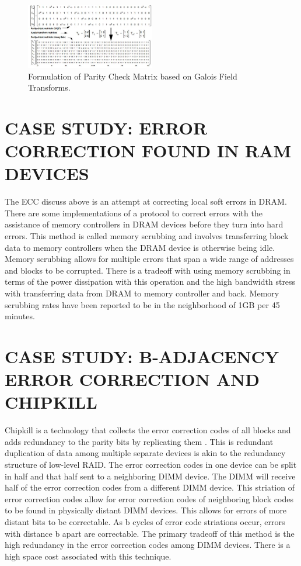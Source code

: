 \documentclass[letterpaper, 10 pt, conference]{ieeeconf}
\begin{document}
\begin{figure}[!ht]
	\centering
	\includegraphics [width=0.5\textwidth] {2-adjacent parity check matrix.JPG} 
    \caption{Formulation of Parity Check Matrix based on Galois Field Transforms.\cite{Jacob}}

\end{figure}


\section{CASE STUDY: ERROR CORRECTION FOUND IN RAM DEVICES}

The ECC discuss above is an attempt at correcting local soft errors in DRAM.  There are some implementations of a protocol to correct errors with the assistance of memory controllers in DRAM devices before they turn into hard errors.  This method is called memory scrubbing and involves transferring block data to memory controllers when the DRAM device is otherwise being idle.  Memory scrubbing allows for multiple errors that span a wide range of addresses and blocks to be corrupted.  There is a tradeoff with using memory scrubbing in terms of the power dissipation with this operation and the high bandwidth stress with transferring data from DRAM to memory controller and back.  Memory scrubbing rates have been reported to be in the neighborhood of 1GB per 45 minutes.\cite{DRAM}

\section{CASE STUDY: B-ADJACENCY ERROR CORRECTION AND CHIPKILL}

Chipkill is a technology that collects the error correction codes of all blocks and adds redundancy to the parity bits by replicating them .  This is redundant duplication of data among multiple separate devices is akin to the redundancy structure of low-level RAID.  The error correction codes in one device can be split in half and that half sent to a neighboring DIMM device.  The DIMM will receive half of the error correction codes from a different DIMM device.  This striation of error correction codes allow for error correction codes of neighboring block codes to be found in physically distant DIMM devices.  This allows for errors of more distant bits to be correctable.  As b cycles of error code striations occur, errors with distance b apart are correctable.  The primary tradeoff of this method is the high redundancy in the error correction codes among DIMM devices.  There is a high space cost associated with this technique.
\end{document}
